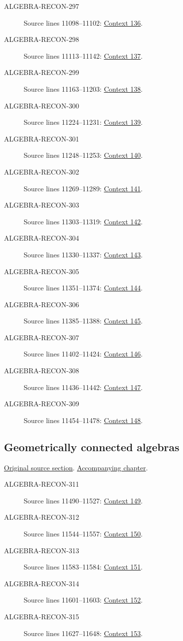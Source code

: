\begin{description}
\item[ALGEBRA-RECON-297] Source lines 11098--11102: \hyperlink{algebra-context-136}{Context 136}.
\item[ALGEBRA-RECON-298] Source lines 11113--11142: \hyperlink{algebra-context-137}{Context 137}.
\item[ALGEBRA-RECON-299] Source lines 11163--11203: \hyperlink{algebra-context-138}{Context 138}.
\item[ALGEBRA-RECON-300] Source lines 11224--11231: \hyperlink{algebra-context-139}{Context 139}.
\item[ALGEBRA-RECON-301] Source lines 11248--11253: \hyperlink{algebra-context-140}{Context 140}.
\item[ALGEBRA-RECON-302] Source lines 11269--11289: \hyperlink{algebra-context-141}{Context 141}.
\item[ALGEBRA-RECON-303] Source lines 11303--11319: \hyperlink{algebra-context-142}{Context 142}.
\item[ALGEBRA-RECON-304] Source lines 11330--11337: \hyperlink{algebra-context-143}{Context 143}.
\item[ALGEBRA-RECON-305] Source lines 11351--11374: \hyperlink{algebra-context-144}{Context 144}.
\item[ALGEBRA-RECON-306] Source lines 11385--11388: \hyperlink{algebra-context-145}{Context 145}.
\item[ALGEBRA-RECON-307] Source lines 11402--11424: \hyperlink{algebra-context-146}{Context 146}.
\item[ALGEBRA-RECON-308] Source lines 11436--11442: \hyperlink{algebra-context-147}{Context 147}.
\item[ALGEBRA-RECON-309] Source lines 11454--11478: \hyperlink{algebra-context-148}{Context 148}.
\end{description}

\subsection{Geometrically connected algebras}
\hypertarget{algebra-source-section-geometrically-connected}{}
\noindent\href{https://github.com/stacks/stacks-project/blob/a04446e57ec1fbc252a871afcec7752fb2807b14/algebra.tex\#L11484}{Original source section}. \href{algebra.pdf\#nameddest=section-geometrically-connected}{Accompanying chapter}.

\begin{description}
\item[ALGEBRA-RECON-311] Source lines 11490--11527: \hyperlink{algebra-context-149}{Context 149}.
\item[ALGEBRA-RECON-312] Source lines 11544--11557: \hyperlink{algebra-context-150}{Context 150}.
\item[ALGEBRA-RECON-313] Source lines 11583--11584: \hyperlink{algebra-context-151}{Context 151}.
\item[ALGEBRA-RECON-314] Source lines 11601--11603: \hyperlink{algebra-context-152}{Context 152}.
\item[ALGEBRA-RECON-315] Source lines 11627--11648: \hyperlink{algebra-context-153}{Context 153}.
\end{description}

